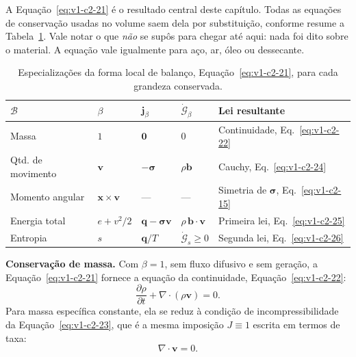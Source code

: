 \documentclass[12pt,a4paper]{article}
\numberwithin{equation}{section}
\numberwithin{table}{section}
\numberwithin{figure}{section}
\begin{document}
A Equação~\eqref{eq:v1-c2-21} é o resultado central deste capítulo. Todas as
equações de conservação usadas no volume saem dela por substituição, conforme
resume a Tabela~\ref{tab:v1-c2-2}. Vale notar o que \emph{não} se supôs para
chegar até aqui: nada foi dito sobre o material. A equação vale igualmente para
aço, ar, óleo ou dessecante.

\begin{table}[H]
\centering
\caption[Especializações da forma local de balanço]{Especializações da forma
local de balanço, Equação~\eqref{eq:v1-c2-21}, para cada grandeza conservada.}
\label{tab:v1-c2-2}
\small
\begin{tabular}{@{}lllll@{}}
\toprule
$\mathcal{B}$ & $\beta$ & $\mathbf{j}_\beta$ & $\dot{\mathcal{G}}_\beta$ & \textbf{Lei resultante} \\
\midrule
Massa & $1$ & $\mathbf{0}$ & $0$ & Continuidade, Eq.~\eqref{eq:v1-c2-22} \\
Qtd. de movimento & $\mathbf{v}$ & $-\boldsymbol{\sigma}$ & $\rho\mathbf{b}$ & Cauchy, Eq.~\eqref{eq:v1-c2-24} \\
Momento angular & $\mathbf{x}\times\mathbf{v}$ & --- & --- & Simetria de $\boldsymbol{\sigma}$, Eq.~\eqref{eq:v1-c2-15} \\
Energia total & $e + v^2/2$ & $\mathbf{q} - \boldsymbol{\sigma}\mathbf{v}$ & $\rho\,\mathbf{b}\cdot\mathbf{v}$ & Primeira lei, Eq.~\eqref{eq:v1-c2-25} \\
Entropia & $s$ & $\mathbf{q}/T$ & $\dot{\mathcal{G}}_s \ge 0$ & Segunda lei, Eq.~\eqref{eq:v1-c2-26} \\
\bottomrule
\end{tabular}
\end{table}

\textbf{Conservação de massa.} Com $\beta = 1$, sem fluxo difusivo e sem
geração, a Equação~\eqref{eq:v1-c2-21} fornece a equação da continuidade,
Equação~\eqref{eq:v1-c2-22}:
\begin{equation}\label{eq:v1-c2-22}
\frac{\partial \rho}{\partial t} + \nabla \cdot (\rho \mathbf{v}) = 0.
\end{equation}
Para massa específica constante, ela se reduz à condição de incompressibilidade
da Equação~\eqref{eq:v1-c2-23}, que é a mesma imposição $J\equiv1$ escrita em
termos de taxa:
\begin{equation}\label{eq:v1-c2-23}
\nabla \cdot \mathbf{v} = 0.
\end{equation}
\end{document}
